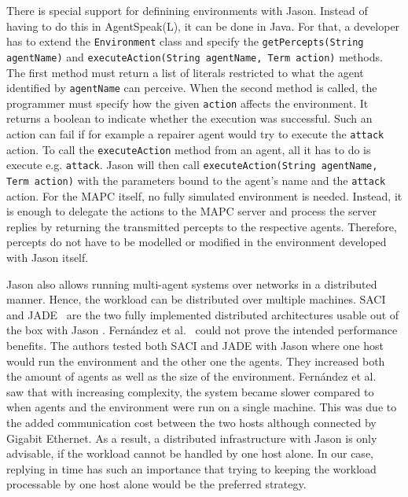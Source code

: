 There is special support for definining environments with Jason. Instead of having to do this in AgentSpeak(L), it can be done in Java. For that, a developer has to extend the \texttt{Environment} class and specify the \texttt{getPercepts(String agentName)} and \texttt{executeAction(String agentName, Term action)} methods. The first method must return a list of literals restricted to what the agent identified by \texttt{agentName} can perceive. When the second method is called, the programmer must specify how the given \texttt{action} affects the environment. It returns a boolean to indicate whether the execution was successful. Such an action can fail if for example a repairer agent would try to execute the \texttt{attack} action. To call the \texttt{executeAction} method from an agent, all it has to do is execute e.g. \texttt{attack}. Jason will then call \texttt{executeAction(String agentName, Term action)} with the parameters bound to the agent's name and the \texttt{attack} action. For the MAPC itself, no fully simulated environment is needed. Instead, it is enough to delegate the actions to the MAPC server and process the server replies by returning the transmitted percepts to the respective agents. Therefore, percepts do not have to be modelled or modified in the environment developed with Jason itself.

Jason also allows running multi-agent systems over networks in a distributed manner. Hence, the workload can be distributed over multiple machines. SACI~\cite{hubner_saci_2000} and JADE~\cite{bellifemine_jade_2005} are the two fully implemented distributed architectures usable out of the box with Jason \cite{bordini_programming_2007}. Fernández et al.~\cite{fernandez_evaluating_2010} could not prove the intended performance benefits. The authors tested both SACI and JADE with Jason where one host would run the environment and the other one the agents. They increased both the amount of agents as well as the size of the environment. Fernández et al.~\cite{fernandez_evaluating_2010} saw that with increasing complexity, the system became slower compared to when agents and the environment were run on a single machine. This was due to the added communication cost between the two hosts although connected by Gigabit Ethernet. As a result, a distributed infrastructure with Jason is only advisable, if the workload cannot be handled by one host alone. In our case, replying in time has such an importance that trying to keeping the workload processable by one host alone would be the preferred strategy.

